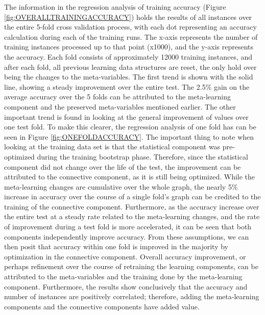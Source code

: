The information in the regression analysis of training
accuracy (Figure \ref{fig:OVERALLTRAININGACCURACY}) holds the results of all instances
over the entire 5-fold cross validation process, with each dot representing an accuracy
calculation during each of the training runs. The x-axis represents the 
number of training instances processed up to that point (x1000), and the y-axis 
represents the accuracy. Each fold consists of approximately 12000 training 
instances, and after each fold, all previous learning data structures are reset, 
the only hold over being the changes to the meta-variables. The first trend is shown 
with the solid line, showing a steady improvement over the entire test. 
The 2.5\% gain on the average accuracy over the 5 folds can be attributed to the 
meta-learning component and the preserved meta-variables mentioned earlier. The 
other important trend is found in looking at the general
improvement of values over one test fold. To make this clearer, the regression
analysis of one fold has can be seen in Figure \ref{fig:ONEFOLDACCURACY}.  The important
thing to note when looking at the training data set is that the statistical component was
pre-optimized during the training bootstrap phase.  Therefore, since the
statistical component did not change over the life of the test, the improvement
can be attributed to the connective component, as it is still being optimized. 
While the meta-learning changes are cumulative over the whole graph, the nearly 
5\% increase in accuracy over the course of a single fold's graph can be credited 
to the training of the connective component. Furthermore, as the accuracy 
increase over the entire test at a steady rate related to the meta-learning changes, and the rate of
improvement during a test fold is more accelerated, it can be seen that both
components independently improve accuracy.  From these assumptions, we can then 
posit that accuracy within one fold is improved in the majority by 
optimization in the connective component.  Overall accuracy improvement, or 
perhaps refinement over the course of retraining the learning components, can be 
attributed to the meta-variables and the training done by the meta-learning 
component. Furthermore, the results show conclusively that the accuracy and 
number of instances are positively correlated; therefore, adding the meta-learning 
components and the connective components have added value.


